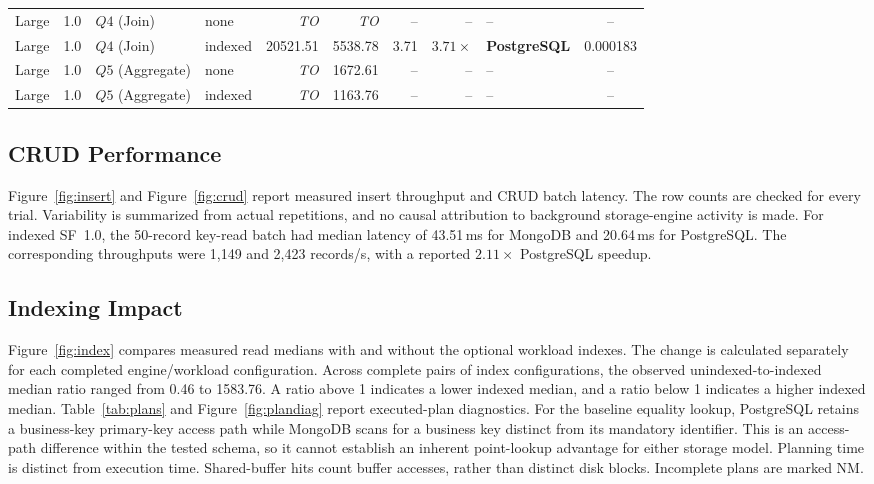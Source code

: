\documentclass[10pt,a4paper,twocolumn]{article}
\begin{document}
\begin{table}[t]
\begin{adjustbox}{max width=\textwidth}
\begin{tabular}{@{}llllrrrrlc@{}}
Large & 1.0 & $Q4$ (Join) & none & \textit{TO} & \textit{TO} & -- & -- & -- & -- \\
Large & 1.0 & $Q4$ (Join) & indexed & 20521.51 & 5538.78 & 3.71 & $3.71\times$ & \textbf{PostgreSQL} & 0.000183 \\
Large & 1.0 & $Q5$ (Aggregate) & none & \textit{TO} & 1672.61 & -- & -- & -- & -- \\
Large & 1.0 & $Q5$ (Aggregate) & indexed & \textit{TO} & 1163.76 & -- & -- & -- & -- \\
\bottomrule
\end{tabular}
\end{adjustbox}
\end{table}

\subsection{CRUD Performance}
Figure~\ref{fig:insert} and Figure~\ref{fig:crud} report measured insert throughput and CRUD batch latency. The row counts are checked for every trial. Variability is summarized from actual repetitions, and no causal attribution to background storage-engine activity is made. For indexed SF~1.0, the 50-record key-read batch had median latency of 43.51\,ms for MongoDB and 20.64\,ms for PostgreSQL. The corresponding throughputs were 1{,}149 and 2{,}423 records/s, with a reported $2.11\times$ PostgreSQL speedup.

\subsection{Indexing Impact}
Figure~\ref{fig:index} compares measured read medians with and without the optional workload indexes. The change is calculated separately for each completed engine/workload configuration. Across complete pairs of index configurations, the observed unindexed-to-indexed median ratio ranged from 0.46 to 1583.76. A ratio above 1 indicates a lower indexed median, and a ratio below 1 indicates a higher indexed median. Table~\ref{tab:plans} and Figure~\ref{fig:plandiag} report executed-plan diagnostics. For the baseline equality lookup, PostgreSQL retains a business-key primary-key access path while MongoDB scans for a business key distinct from its mandatory identifier. This is an access-path difference within the tested schema, so it cannot establish an inherent point-lookup advantage for either storage model. Planning time is distinct from execution time. Shared-buffer hits count buffer accesses, rather than distinct disk blocks. Incomplete plans are marked NM.
\end{document}
